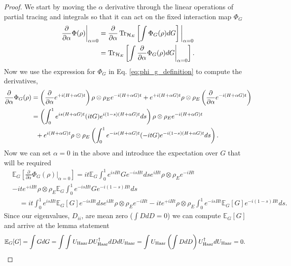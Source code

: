 \begin{proof}
    We start by moving the $\alpha$ derivative through the linear operations of partial tracing and integrals so that it can act on the fixed interaction map $\Phi_G$
    \begin{align}
        \frac{\partial}{\partial \alpha} \Phi(\rho) \bigg|_{\alpha = 0} &= \frac{\partial}{\partial \alpha} \operatorname{Tr}_{\mathcal{H}_E} \left[  \int \Phi_G(\rho) dG  \right] \bigg|_{\alpha = 0} \\
         &= \operatorname{Tr}_{\mathcal{H}_E} \left[  \int \frac{\partial}{\partial \alpha} \Phi_G(\rho) dG \bigg|_{\alpha = 0}   \right] .
    \end{align}
    Now we use the expression for $\Phi_G$ in Eq. \eqref{eq:phi_g_definition} to compute the derivatives,
    \begin{align}
        \frac{\partial}{\partial \alpha} \Phi_G (\rho) &= \left( \frac{\partial}{\partial \alpha} e^{+ i (H + \alpha G)t} \right) \rho \otimes \rho_E e^{-i (H + \alpha G) t} + e^{+i (H + \alpha G)t} \rho \otimes \rho_E \left( \frac{\partial}{\partial \alpha} e^{- i (H + \alpha G)t} \right) \\
        &= \left( \int_{0}^{1} e^{i s (H+\alpha G)t} (i t G) e^{i (1-s) (H+\alpha G)t} ds \right) \rho \otimes \rho_E e^{-i(H+\alpha G)t} \nonumber \\
    &~ ~+ e^{i(H+\alpha G)t} \rho \otimes \rho_E \left( \int_{0}^1 e^{-i s (H+\alpha G) t} (- i t G) e^{-i (1-s) (H+\alpha G)t} ds \right). \label{eq:first_order_alpha_derivative}
    \end{align}
    Now we can set $\alpha = 0$ in the above and introduce the expectation over $G$ that will be required
    \begin{align}
        &\mathbb{E}_G\left[ \frac{\partial}{\partial \alpha} \Phi_G(\rho) \bigg|_{\alpha = 0}\right] = i t \mathbb{E}_G \int_0^1 e^{i s H t} G e^{-i s H t} ds e^{i H t} \rho \otimes \rho_E e^{-i H t} \nonumber\\
&- i t e^{+i H t} \rho \otimes \rho_E \mathbb{E}_G \int_0^1 e^{-is H t} G e^{-i(1-s) Ht} ds \\ 
        &\quad= i t \int_0^1 e^{i s H t} \mathbb{E}_G[G] e^{-i s H t} ds e^{i H t} \rho \otimes \rho_E e^{-i H t} - i t e^{+i H t} \rho \otimes \rho_E \int_0^1 e^{-is H t} \mathbb{E}_G[G] e^{-i(1-s) Ht} ds.
    \end{align}
    Since our eigenvalues, $D_{ii}$, are mean zero ($\int D dD = 0$) we can compute $\mathbb{E}_G [G] $ and arrive at the lemma statement
    \begin{align}
        \mathbb{E}_G [G] &= \int G dG = \int \int U_{\text{Haar}} D U_{\text{Haar}}^\dagger dD dU_{\text{Haar}} = \int U_{\text{Haar}} \left( \int D dD \right) U_{\text{Haar}}^\dagger dU_{\text{Haar}} = 0.
    \end{align}
\end{proof}

